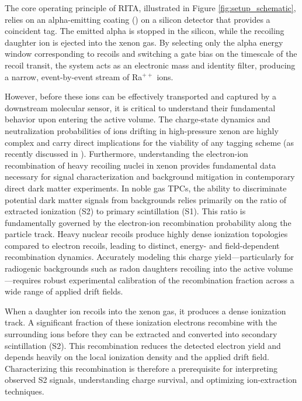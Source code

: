 The core operating principle of RITA, illustrated in Figure \ref{fig:setup_schematic}, relies on an
alpha-emitting coating () on a silicon detector that provides a coincident tag.
The emitted alpha is stopped in the silicon, while the recoiling daughter ion is ejected into the
xenon gas. By selecting only the alpha energy window corresponding to  recoils and
switching a gate bias on the timescale of the recoil transit, the system acts as an electronic mass
and identity filter, producing a narrow, event-by-event stream of Ra$^{++}$ ions.

However, before these ions can be effectively transported and captured by a downstream molecular
sensor, it is critical to understand their fundamental behavior upon entering the active volume.
The charge-state dynamics and neutralization probabilities of ions drifting in high-pressure xenon
are highly complex and carry direct implications for the viability of any tagging scheme (as
recently discussed in \cite{peralta_conde_a_charge-state_2026}). Furthermore, understanding the
electron-ion recombination of heavy recoiling nuclei in xenon provides fundamental data necessary
for signal characterization and background mitigation in contemporary direct dark matter
experiments. In noble gas TPCs, the ability to discriminate potential dark matter signals from
backgrounds relies primarily on the ratio of extracted ionization (S2) to primary scintillation
(S1). This ratio is fundamentally governed by the electron-ion recombination probability along the
particle track. Heavy nuclear recoils produce highly dense ionization topologies compared to
electron recoils, leading to distinct, energy- and field-dependent recombination dynamics.
Accurately modeling this charge yield—particularly for radiogenic backgrounds such as radon
daughters recoiling into the active volume—requires robust experimental calibration of the
recombination fraction across a wide range of applied drift fields.

When a daughter ion recoils into the xenon gas, it produces a dense ionization track. A significant
fraction of these ionization electrons recombine with the surrounding ions before they can be
extracted and converted into secondary scintillation (S2). This recombination reduces the detected
electron yield and depends heavily on the local ionization density and the applied drift field.
Characterizing this recombination is therefore a prerequisite for interpreting observed S2 signals,
understanding charge survival, and optimizing ion-extraction techniques.

